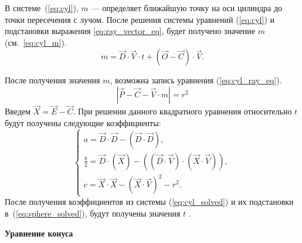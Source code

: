 В системе~(\ref{eq:cyl}), $m$ --- определяет ближайшую точку на оси цилиндра до точки пересечения с лучом. После решения системы уравнений (\ref{eq:cyl})  и подстановки выражения \ref{eq:ray_vector_eq}, будет получено значение $m$ (см.~\ref{eq:cyl_m}).
\begin{equation}
	m = \vec{D} \cdot \vec{V} \cdot t  + (\vec{O} - \vec{C}) \cdot \vec{V}.
	\label{eq:cyl_m}
\end{equation}

После получения значения $m$, возможна запись уравнения (\ref{eq:cyl_ray_eq}).
\begin{equation}
 	|\vec{P}-\vec{C}-\vec{V} \cdot m| = r^{2}
	\label{eq:cyl_ray_eq}
\end{equation}
Введем $\vec{X} = \vec{E} - \vec{C}$.
При решении данного квадратного уравнения относительно $t$ будут получены следующие коэффициенты:
\begin{equation}
	\begin{cases}
		a = \vec{D} \cdot \vec{D} - (\vec{D} \cdot \vec{D}), \\
		\frac{b}{2} = \vec{D} \cdot (\vec{X}) - ((\vec{D} \cdot \vec{V}) \cdot (\vec{X} \cdot \vec{V})), \\
		c = \vec{X} \cdot \vec{X} - (\vec{X} \cdot \vec{V})^{2} - r^{2}.
	\end{cases}
	\label{eq:cyl_solved}
\end{equation}
После получения коэффициентов из системы (\ref{eq:cyl_solved}) и их подстановки в~(\ref{eq:sphere_solved}), будут получены значения $t$ \cite{cyl_inter}.


\textbf{Уравнение конуса}

